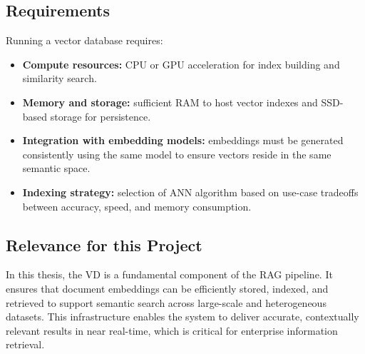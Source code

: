 \subsection{Requirements}
Running a vector database requires:
\begin{itemize}
    \item \textbf{Compute resources:} CPU or GPU acceleration for index building and similarity search.
    \item \textbf{Memory and storage:} sufficient RAM to host vector indexes and SSD-based storage for persistence.
    \item \textbf{Integration with embedding models:} embeddings must be generated consistently using the same model to ensure vectors reside in the same semantic space.
    \item \textbf{Indexing strategy:} selection of ANN algorithm based on use-case tradeoffs between accuracy, speed, and memory consumption.
\end{itemize}

\subsection{Relevance for this Project}
In this thesis, the \ac{VD} is a fundamental component of the RAG pipeline. It ensures that document embeddings can be efficiently stored, indexed, and retrieved to support semantic search across large-scale and heterogeneous datasets. This infrastructure enables the system to deliver accurate, contextually relevant results in near real-time, which is critical for enterprise information retrieval.


